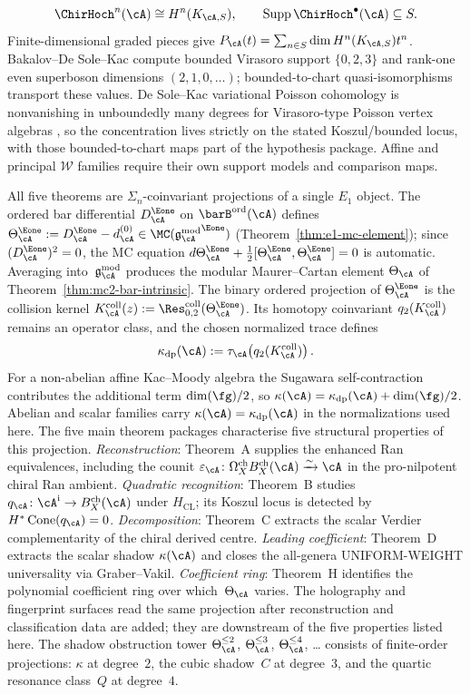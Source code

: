 \[
 \ChirHoch^n(\cA)\cong H^n(K_{\cA,S}),
 \qquad
 \operatorname{Supp}\ChirHoch^\bullet(\cA)\subseteq S.
\]
Finite-dimensional graded pieces give
$P_\cA(t)=\sum_{n\in S}\dim H^n(K_{\cA,S})t^n$.
Bakalov--De Sole--Kac compute bounded Virasoro support
$\{0,2,3\}$ and rank-one even superboson dimensions
$(2,1,0,\ldots)$; bounded-to-chart quasi-isomorphisms transport these
values.  De Sole--Kac variational Poisson cohomology is nonvanishing
in unboundedly many degrees for Virasoro-type Poisson vertex algebras
\cite{BDSK21}, so the concentration lives strictly on the stated
Koszul/bounded locus, with those bounded-to-chart maps part of the
hypothesis package.  Affine and principal $\mathcal W$ families
require their own support models and comparison maps.

\medskip\noindent
All five theorems are $\Sigma_n$-coinvariant projections of a single
$E_1$ object.
The ordered bar differential $D_\cA^{\Eone}$ on
$\barB^{\mathrm{ord}}(\cA)$ defines
$\Theta_\cA^{\Eone} := D_\cA^{\Eone} - d_\cA^{(0)}
\in \MC({\gAmod}^{\Eone})$
(Theorem~\ref{thm:e1-mc-element}); since
$(D_\cA^{\Eone})^2 = 0$, the MC equation
$d\Theta_\cA^{\Eone} + \tfrac{1}{2}[\Theta_\cA^{\Eone}, \Theta_\cA^{\Eone}] = 0$
is automatic. Averaging into~$\gAmod$ produces the modular
Maurer--Cartan element $\Theta_\cA$ of
Theorem~\ref{thm:mc2-bar-intrinsic}. The binary ordered projection of
$\Theta_\cA^{\Eone}$ is the collision kernel
$K_\cA^{\mathrm{coll}}(z)
:=\Res^{\mathrm{coll}}_{0,2}(\Theta_\cA^{\Eone})$.  Its homotopy
coinvariant $q_2(K_\cA^{\mathrm{coll}})$ remains an operator class,
and the chosen normalized trace defines
\[
 \kappa_{\mathrm{dp}}(\cA)
 :=\tau_\cA\!\left(q_2(K_\cA^{\mathrm{coll}})\right).
\]
For a non-abelian affine Kac--Moody algebra the Sugawara
self-contraction contributes the additional term $\dim(\fg)/2$, so
$\kappa(\cA)=\kappa_{\mathrm{dp}}(\cA)+\dim(\fg)/2$.  Abelian and
scalar families carry $\kappa(\cA)=\kappa_{\mathrm{dp}}(\cA)$ in the
normalizations used here.  The five
main theorem packages characterise five structural properties of this
projection.
\emph{Reconstruction}: Theorem~A supplies the enhanced Ran
equivalences, including the counit
$\varepsilon_\cA\colon\Omega_X^{\mathrm{ch}}B_X^{\mathrm{ch}}(\cA)
\xrightarrow{\sim}\cA$ in the pro-nilpotent chiral Ran ambient.
\emph{Quadratic recognition}: Theorem~B studies
$q_\cA\colon\cA^{\mathrm i}\to B_X^{\mathrm{ch}}(\cA)$ under
$H_{\mathrm{CL}}$; its Koszul locus is detected by
$H^*\operatorname{Cone}(q_\cA)=0$.
\emph{Decomposition}: Theorem~C extracts the scalar Verdier
complementarity of the chiral derived centre.
\emph{Leading coefficient}: Theorem~D extracts the scalar shadow
$\kappa(\cA)$ and closes the all-genera UNIFORM-WEIGHT universality
via Graber--Vakil.
\emph{Coefficient ring}: Theorem~H identifies the polynomial
coefficient ring over which~$\Theta_\cA$ varies. The holography and
fingerprint surfaces read the same projection after reconstruction
and classification data are added; they are downstream of the five
properties listed here.
The shadow obstruction tower $\Theta_\cA^{\leq 2}$,
$\Theta_\cA^{\leq 3}$, $\Theta_\cA^{\leq 4}$, \ldots{}
consists of finite-order projections:
$\kappa$ at degree~$2$, the cubic shadow~$C$ at
degree~$3$, and the quartic resonance class~$Q$ at
degree~$4$.

